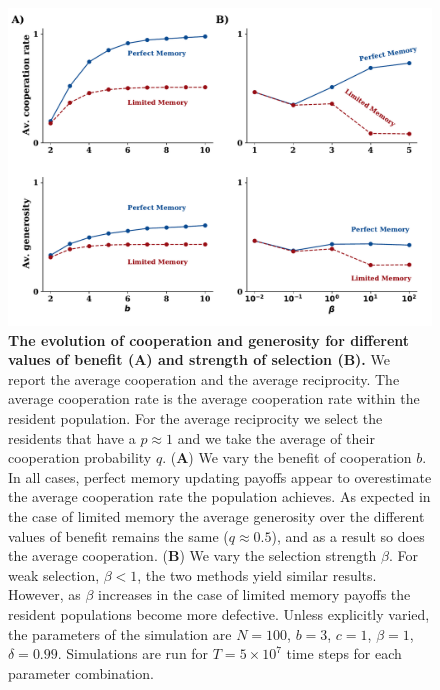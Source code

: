 \documentclass[11pt]{article}
\theoremstyle{plainCl1}
\theoremstyle{plainCl2}
\begin{document}
\begin{figure}[!htbp]
    \centering
    \includegraphics[width=.75\textwidth]{static/cooperation_rate_over_b_and_beta.pdf}
    \caption{{\bf The evolution of cooperation and generosity for different
    values of benefit (A) and strength of selection (B).} We report the average
    cooperation and the average reciprocity. The average cooperation rate is the
    average cooperation rate within the resident population. For the average
    reciprocity we select the residents that have a $p \approx 1$ and we take
    the average of their cooperation probability $q$. ({\bf A}) We vary the
    benefit of cooperation $b$. In all cases, perfect memory updating payoffs
    appear to overestimate the average cooperation rate the population achieves.
    As expected in the case of limited memory the average generosity over the
    different values of benefit remains the same ($q \approx 0.5$), and as a
    result so does the average cooperation. ({\bf B}) We vary the selection
    strength $\beta$. For weak selection, \(\beta < 1\), the two methods yield
    similar results. However, as \(\beta\) increases in the case of limited
    memory payoffs the resident populations become more defective. Unless
    explicitly varied, the parameters of the simulation are $N\!=\!100$,
    $b\!=\!3$, $c\!=\!1$, $\beta\!=\!1$, $\delta\!=\!0.99$. Simulations are run
    for $T\!=\!5\times 10^7$ time steps for each parameter
    combination.}\label{fig:cooperation_rate_over_benefit_and_beta}
\end{figure}
\end{document}
